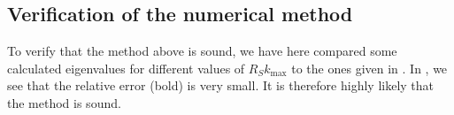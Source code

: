 \documentclass[11pt,a4paper, 
swedish,english %
]{article}
\begin{document}



\subsection{Verification of the numerical method}
To verify that the method above is sound, we have here compared some calculated eigenvalues for different values of $R_Sk_{\max}$ to the ones given in \cite{PSWF-IV_1964}. In , we see that the relative error (bold) is very small. It is therefore highly likely that the method is sound.
\end{document}
